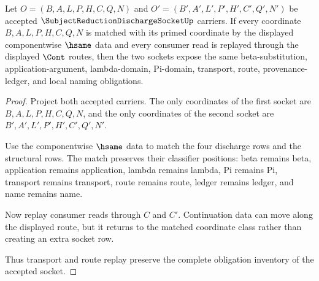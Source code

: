 \begin{theorem}
\label{thm:subject-reduction-discharge-socket-transport-route-stability}
Let $O=(B,A,L,P,H,C,Q,N)$ and $O'=(B',A',L',P',H',C',Q',N')$ be accepted $\SubjectReductionDischargeSocketUp$ carriers. If every coordinate $B,A,L,P,H,C,Q,N$ is matched with its primed coordinate by the displayed componentwise $\hsame$ data and every consumer read is replayed through the displayed $\Cont$ routes, then the two sockets expose the same beta-substitution, application-argument, lambda-domain, Pi-domain, transport, route, provenance-ledger, and local naming obligations.
\end{theorem}
\begin{proof}
Project both accepted carriers. The only coordinates of the first socket are $B,A,L,P,H,C,Q,N$, and the only coordinates of the second socket are $B',A',L',P',H',C',Q',N'$.

Use the componentwise $\hsame$ data to match the four discharge rows and the structural rows. The match preserves their classifier positions: beta remains beta, application remains application, lambda remains lambda, Pi remains Pi, transport remains transport, route remains route, ledger remains ledger, and name remains name.

Now replay consumer reads through $C$ and $C'$. Continuation data can move along the displayed route, but it returns to the matched coordinate class rather than creating an extra socket row.

Thus transport and route replay preserve the complete obligation inventory of the accepted socket.
\end{proof}

